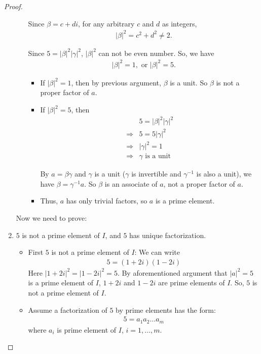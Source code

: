\documentclass[utf8]{ctexbook}
\begin{document}
\begin{proof}
\begin{enumerate}
\begin{itemize}
{Since $\beta = c + d i$, for any arbitrary $c$ and $d$ as integers,
\begin{align*}
|\beta |^2 = c^2 + d^2 \neq 2 .
\end{align*}


Since $5 =  |\beta |^2 | \gamma |^2$, $|\beta |^2$ can not be even number. So, we have 
\begin{align*}
|\beta |^2 = 1, \mbox{ or } |\beta |^2 = 5 .
\end{align*}


\begin{itemize}
\item{If $|\beta |^2 = 1$, then by previous argument, $\beta$ is a unit. So $\beta$ is not a proper factor of $a$.}
\item{If $|\beta |^2 = 5 $, then 
\begin{align*}
& 5 =  |\beta |^2 | \gamma |^2  \\
\Longrightarrow & 5 = 5 | \gamma |^2  \\
\Longrightarrow & | \gamma |^2 = 1 \\
\Longrightarrow & \gamma \mbox{ is a unit}
\end{align*}

By $a = \beta \gamma $ and $\gamma$ is a unit ($\gamma$ is invertible and $\gamma^{-1}$ is also a unit), we have $\beta = \gamma^{-1} a$. So $\beta$ is an associate of $a$, not a proper factor of $a$.
}
\item{ Thus, $a$ has only trivial factors, so $a$ is a prime element.}
\end{itemize}

}
\end{itemize}


Now we need to prove:
\item{$5$ is not a prime element of $I$, and $5$ has unique factorization.}
\begin{itemize}
\item{First $5$ is not a prime element of $I$:
We can write
\begin{align*}
5 = (1 + 2 i ) (1 - 2 i )
\end{align*}
Here $|1 + 2i|^2 = | 1-2i|^2 = 5$. By aforementioned argument that $|a|^2 = 5$ is a prime element of $I$, $1 + 2i$ and $1 - 2i$ are prime elements of $I$. So, $5 $ is not a prime element of $I$.}
\item{Assume a factorization of $5$ by prime elements has the form:
\begin{align*}
5 = a_1 a_2 \ldots a_m
\end{align*}
where $a_i$ is prime element of $I$, $i = 1, \ldots, m$.

}
\end{itemize}
\end{enumerate}
\end{proof}
\end{document}
